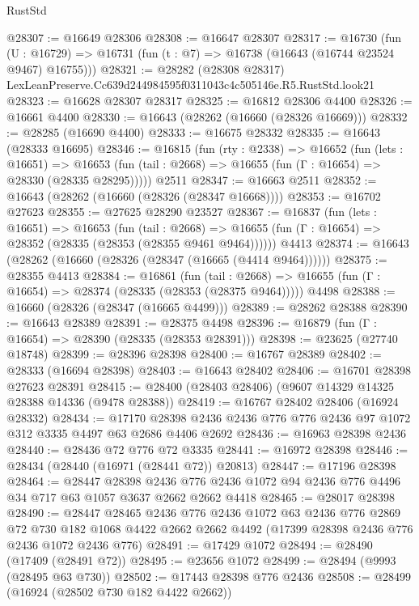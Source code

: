 \begin{lexlean}{RustStd}
\begin{coremodule}
@28307 := @16649 @28306
@28308 := @16647 @28307
@28317 := @16730
    (fun (U : @16729) => @16731 (fun (t : @7) => @16738 (@16643 (@16744 @23524 @9467) @16755)))
@28321 := @28282 (@28308 @28317) LexLeanPreserve.Cc639d244984595f0311043c4c505146e.R5.RustStd.look21
@28323 := @16628 @28307 @28317
@28325 := @16812 @28306 @4400
@28326 := @16661 @4400
@28330 := @16643 (@28262 (@16660 (@28326 @16669)))
@28332 := @28285 (@16690 @4400)
@28333 := @16675 @28332
@28335 := @16643 (@28333 @16695)
@28346 := @16815
    (fun (rty : @2338) =>
    @16652
      (fun (lets : @16651) =>
      @16653 (fun (tail : @2668) => @16655 (fun (Γ : @16654) => @28330 (@28335 @28295)))))
    @2511
@28347 := @16663 @2511
@28352 := @16643 (@28262 (@16660 (@28326 (@28347 @16668))))
@28353 := @16702 @27623
@28355 := @27625 @28290 @23527
@28367 := @16837
    (fun (lets : @16651) =>
    @16653
      (fun (tail : @2668) =>
      @16655 (fun (Γ : @16654) => @28352 (@28335 (@28353 (@28355 @9461 @9464))))))
    @4413
@28374 := @16643 (@28262 (@16660 (@28326 (@28347 (@16665 (@4414 @9464))))))
@28375 := @28355 @4413
@28384 := @16861
    (fun (tail : @2668) => @16655 (fun (Γ : @16654) => @28374 (@28335 (@28353 (@28375 @9464)))))
    @4498
@28388 := @16660 (@28326 (@28347 (@16665 @4499)))
@28389 := @28262 @28388
@28390 := @16643 @28389
@28391 := @28375 @4498
@28396 := @16879 (fun (Γ : @16654) => @28390 (@28335 (@28353 @28391)))
@28398 := @23625 (@27740 @18748)
@28399 := @28396 @28398
@28400 := @16767 @28389
@28402 := @28333 (@16694 @28398)
@28403 := @16643 @28402
@28406 := @16701 @28398 @27623 @28391
@28415 := @28400 (@28403 @28406) (@9607 @14329 @14325 @28388 @14336 (@9478 @28388))
@28419 := @16767 @28402 @28406 (@16924 @28332)
@28434 := @17170 @28398 @2436 @2436 @776 @776 @2436 @97 @1072 @312 @3335 @4497 @63 @2686 @4406 @2692
@28436 := @16963 @28398 @2436
@28440 := @28436 @72 @776 @72 @3335
@28441 := @16972 @28398
@28446 := @28434 (@28440 (@16971 (@28441 @72)) @20813)
@28447 := @17196 @28398
@28464 := @28447
    @28398
    @2436
    @776
    @2436
    @1072
    @94
    @2436
    @776
    @4496
    @34
    @717
    @63
    @1057
    @3637
    @2662
    @2662
    @4418
@28465 := @28017 @28398
@28490 := @28447
    @28465
    @2436
    @776
    @2436
    @1072
    @63
    @2436
    @776
    @2869
    @72
    @730
    @182
    @1068
    @4422
    @2662
    @2662
    @4492
    (@17399 @28398 @2436 @776 @2436 @1072 @2436 @776)
@28491 := @17429 @1072
@28494 := @28490 (@17409 (@28491 @72))
@28495 := @23656 @1072
@28499 := @28494 (@9993 (@28495 @63 @730))
@28502 := @17443 @28398 @776 @2436
@28508 := @28499 (@16924 (@28502 @730 @182 @4422 @2662))

\end{coremodule}
\end{lexlean}
